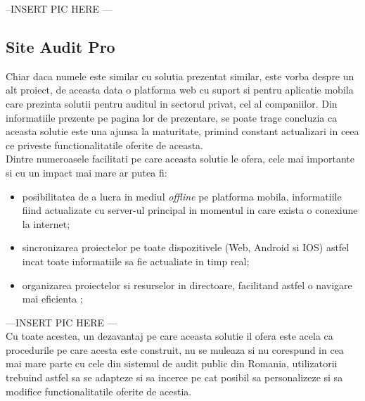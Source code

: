 --INSERT PIC HERE --- \\
	
	\subsection*{Site Audit Pro }
	
	Chiar daca numele este similar cu solutia prezentat similar, este vorba despre un alt proiect, de aceasta data o platforma web cu suport si pentru aplicatie mobila care prezinta solutii pentru auditul in sectorul privat, cel al companiilor.
	Din informatiile prezente pe pagina  lor de prezentare, se poate trage concluzia ca aceasta solutie este una ajunsa la maturitate, primind constant actualizari in ceea ce priveste functionalitatile oferite de aceasta.\\ 
	Dintre numeroasele facilitati pe care aceasta solutie le ofera, cele mai importante si cu un impact mai mare ar putea fi:
	\begin{itemize}
		\item posibilitatea de a lucra in mediul \textit{offline} pe platforma mobila, informatiile fiind actualizate cu server-ul principal in momentul in care exista o conexiune la internet;
		
		\item sincronizarea proiectelor pe toate dispozitivele (Web, Android si IOS) astfel incat toate informatiile sa fie actualiate in timp real;
		
		\item organizarea proiectelor si resurselor in directoare, facilitand astfel o navigare mai eficienta ;
	\end{itemize}
	---INSERT PIC HERE --- \\
	Cu toate acestea, un dezavantaj pe care aceasta solutie il ofera este acela ca procedurile pe care acesta este construit, nu se muleaza si nu corespund in cea mai mare parte cu cele din sistemul de audit public din Romania, utilizatorii trebuind astfel sa se adapteze si sa incerce pe cat posibil sa personalizeze si sa modifice functionalitatile oferite de acestia.
	
